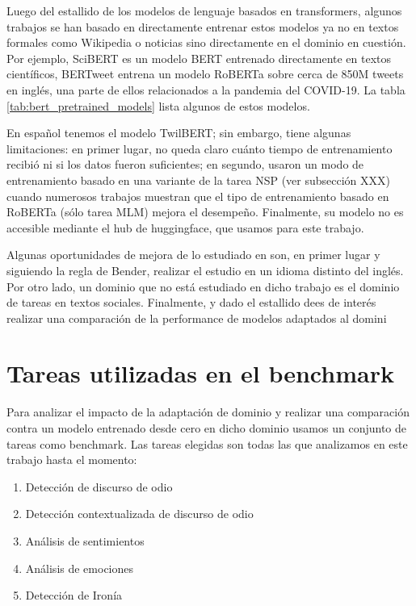 Luego del estallido de los modelos de lenguaje basados en transformers, algunos trabajos se han basado en directamente entrenar estos modelos ya no en textos formales como Wikipedia o noticias sino directamente en el dominio en cuestión. Por ejemplo, SciBERT \cite{beltagy-etal-2019-scibert} es un modelo BERT entrenado directamente en textos científicos, BERTweet \cite{bertweet} entrena un modelo RoBERTa\cite{liu2019roberta} sobre cerca de 850M tweets en inglés, una parte de ellos relacionados a la pandemia del COVID-19. La tabla \ref{tab:bert_pretrained_models} lista algunos de estos modelos.

En español tenemos el modelo TwilBERT\cite{gonzalez2021twilbert}; sin embargo, tiene algunas limitaciones: en primer lugar, no queda claro cuánto tiempo de entrenamiento recibió ni si los datos fueron suficientes; en segundo, usaron un modo de entrenamiento basado en una variante de la tarea NSP (ver subsección XXX) cuando numerosos trabajos muestran que el tipo de entrenamiento basado en RoBERTa (sólo tarea MLM) mejora el desempeño. Finalmente, su modelo no es accesible mediante el hub de huggingface, que usamos para este trabajo.


Algunas oportunidades de mejora de lo estudiado en \citet{gururangan-etal-2020-dont} son, en primer lugar y siguiendo la regla de Bender\cite{bender2011achieving}, realizar el estudio en un idioma distinto del inglés. Por otro lado, un dominio que no está estudiado en dicho trabajo es el dominio de tareas en textos sociales. Finalmente, y dado el estallido dees de interés realizar una comparación de la performance de modelos adaptados al domini

\section{Tareas utilizadas en el benchmark}

Para analizar el impacto de la adaptación de dominio y realizar una comparación contra un modelo entrenado desde cero en dicho dominio usamos un conjunto de tareas como benchmark. Las tareas elegidas son todas las que analizamos en este trabajo hasta el momento:

\begin{enumerate}
    \item Detección de discurso de odio
    \item Detección contextualizada de discurso de odio
    \item Análisis de sentimientos
    \item Análisis de emociones
    \item Detección de Ironía
\end{enumerate}

